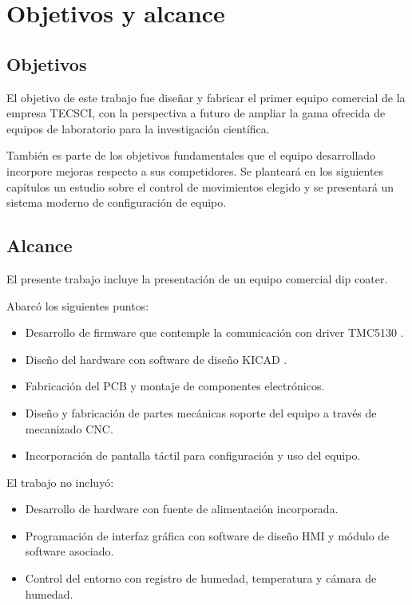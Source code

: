 
\section{Objetivos y alcance}

\subsection{Objetivos}

El objetivo de este trabajo fue diseñar y fabricar el primer equipo comercial de la empresa TECSCI, con la perspectiva a futuro de ampliar la gama ofrecida de equipos de laboratorio para la investigación científica.

También es parte de los objetivos fundamentales que el equipo desarrollado incorpore mejoras respecto a sus competidores. Se planteará en los siguientes capítulos un estudio sobre el control de movimientos elegido y se presentará un sistema moderno de configuración de equipo. 

\subsection{Alcance}

El presente trabajo incluye la presentación de un equipo comercial dip coater. 


Abarcó los siguientes puntos:

\begin{itemize}
\item Desarrollo de firmware que contemple la comunicación con driver TMC5130 \citep{3_web_trinamic_producto}.
\item Diseño del hardware con software de diseño KICAD \citep{web_kicad}.
\item Fabricación del PCB y montaje de componentes electrónicos.
\item Diseño y fabricación de partes mecánicas soporte del equipo a través de mecanizado CNC.
\item Incorporación de pantalla táctil para configuración y uso del equipo.
\end{itemize}



El trabajo no incluyó:

\begin{itemize}
\item Desarrollo de hardware con fuente de alimentación incorporada.
\item Programación de interfaz gráfica con software de diseño HMI  y módulo de software asociado.
\item Control del entorno con registro de humedad, temperatura y  cámara de humedad.
\end{itemize}


